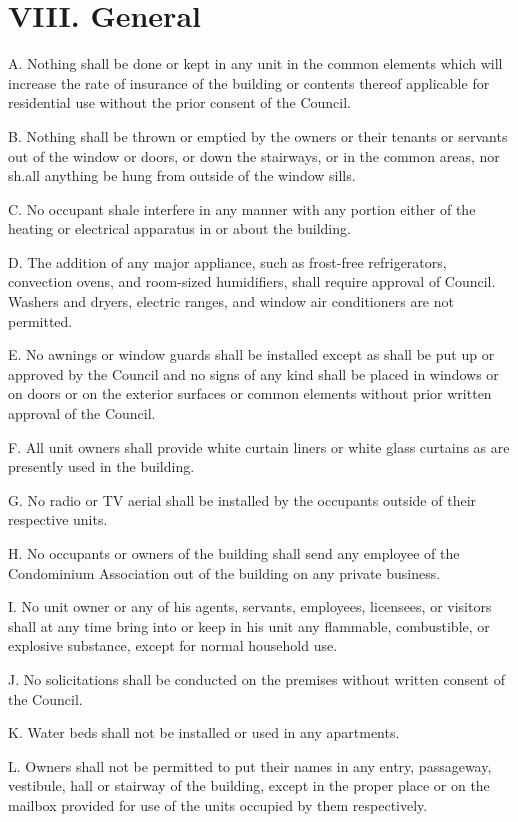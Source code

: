 \documentclass[
]{book}
\begin{document}
\hypertarget{viii.-general}{%
\section*{VIII. General}\label{viii.-general}}

A. Nothing shall be done or kept in any unit in the common elements which will increase the rate of insurance of the building or contents thereof applicable for residential use without the prior consent of the Council.

B. Nothing shall be thrown or emptied by the owners or their tenants or servants out of the window or doors, or down the stairways, or in the common areas, nor sh.all anything be hung from outside of the window sills.

C. No occupant shale interfere in any manner with any portion either of the heating or electrical apparatus in or about the building.

D. The addition of any major appliance, such as frost-free refrigerators, convection ovens, and room-sized humidifiers, shall require approval of Council. Washers and dryers, electric ranges, and window air conditioners are not permitted.

E. No awnings or window guards shall be installed except as shall be put up or approved by the Council and no signs of any kind shall be placed in windows or on doors or on the exterior surfaces or common elements without prior written approval of the Council.

F. All unit owners shall provide white curtain liners or white glass curtains as are presently used in the building.

G. No radio or TV aerial shall be installed by the occupants outside of their respective units.

H. No occupants or owners of the building shall send any employee of the Condominium Association out of the building on any private business.

I. No unit owner or any of his agents, servants, employees, licensees, or visitors shall at any time bring into or keep in his unit any flammable, combustible, or explosive substance, except for normal household use.

J. No solicitations shall be conducted on the premises without written consent of the Council.

K. Water beds shall not be installed or used in any apartments.

L. Owners shall not be permitted to put their names in any entry, passageway, vestibule, hall or stairway of the building, except in the proper place or on the mailbox provided for use of the units occupied by them respectively.
\end{document}
